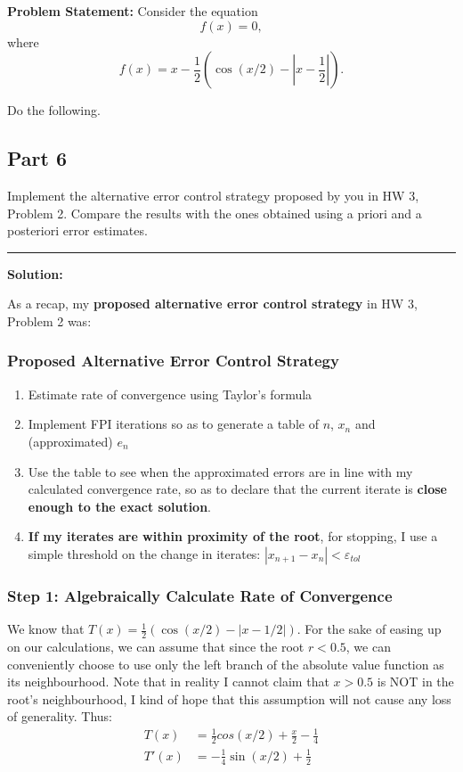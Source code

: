 \clearpage
{}

\textbf{Problem Statement:} Consider the equation
$$f(x) = 0,$$
where
$$f(x) = x - \frac{1}{2}\left(\cos(x/2) - \left|x - \frac{1}{2}\right|\right).$$

Do the following.

\subsection*{Part 6}

Implement the alternative error control strategy proposed by you in HW 3, Problem 2. Compare the results with the ones obtained using a priori and a posteriori error estimates.

\noindent\rule{\textwidth}{0.4pt}

\vspace{1em}

\textbf{Solution:}

As a recap, my \textbf{proposed alternative error control strategy} in HW 3, Problem 2 was:

\subsubsection*{Proposed Alternative Error Control Strategy}
\begin{enumerate}
    \item Estimate rate of convergence using Taylor's formula
    \item Implement FPI iterations so as to generate a table of $n$, $x_n$ and (approximated) $e_n$
    \item Use the table to see when the approximated errors are in line with my calculated convergence rate, so as to declare that the current iterate is \textbf{close enough to the exact solution}.
    \item \textbf{If my iterates are within proximity of the root}, for stopping, I use a simple threshold on the change in iterates: $|x_{n+1} - x_n| < \varepsilon_{tol}$
\end{enumerate}

\subsubsection*{Step 1: Algebraically Calculate Rate of Convergence}

We know that $T(x) = \frac{1}{2}\left(\cos(x/2) - |x - 1/2|\right)$. For the sake of easing up on our calculations, we can assume that since the root $r<0.5$, we can conveniently choose to use only the left branch of the absolute value function as its neighbourhood. Note that in reality I cannot claim that $x>0.5$ is NOT in the root's neighbourhood, I kind of hope that this assumption will not cause any loss of generality.
Thus:
\begin{align*}
    T(x) &= \frac{1}{2}cos(x/2) + \frac{x}{2} - \frac{1}{4} \\
    T'(x) &= -\frac{1}{4}\sin(x/2) + \frac{1}{2} \\
\end{align*}

